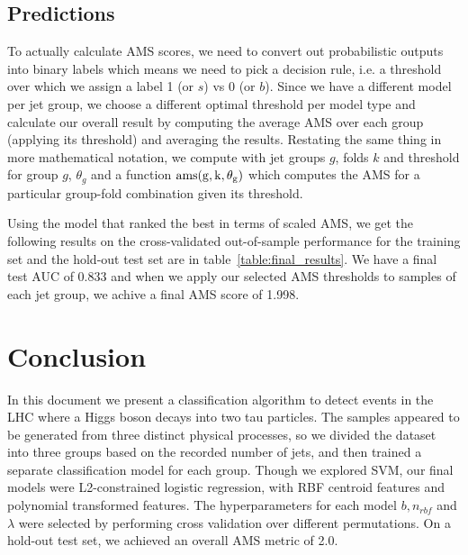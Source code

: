 \subsection{Predictions}
To actually calculate AMS scores, we need to convert out probabilistic outputs into binary labels which means we need to pick a decision rule, i.e. a threshold over which we assign a label 1 (or $s$) vs 0 (or $b$). Since we have a different model per jet group, we choose a different optimal threshold per model type and calculate our overall result by computing the average AMS over each group (applying its threshold) and averaging the results. Restating the same thing in more mathematical notation, we compute 
with jet groups $g$, folds $k$ and threshold for group $g$, $\theta_g$ and a function $\rm{ams}(g, k, \theta_g)$ which computes the AMS for a particular group-fold combination given its threshold.

Using the model that ranked the best in terms of scaled AMS, we get the following results on the cross-validated out-of-sample performance for the training set and the hold-out test set are in table~\ref{table:final_results}. We have a final test AUC of 0.833 and when we apply our selected AMS thresholds to samples of each jet group, we achive a final AMS score of 1.998.



\section{Conclusion}
\label{conclusion}
In this document we present a classification algorithm to detect events in the LHC where a Higgs boson decays into two tau particles. The samples appeared to be generated from three distinct physical processes, so we divided the dataset into three groups based on the recorded number of jets, and then trained a separate classification model for each group. Though we explored SVM, our final models were L2-constrained logistic regression, with RBF centroid features and polynomial transformed features. The hyperparameters for each model $b, n_{rbf}$ and $\lambda$ were selected by performing cross validation over different permutations. On a hold-out test set, we achieved an overall AMS metric of 2.0. 

\pagebreak 


{}


